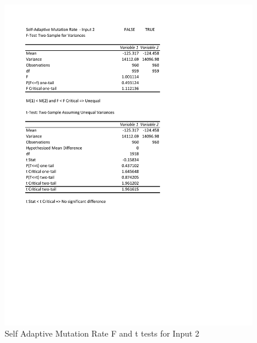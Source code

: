 \documentclass[times]{article}
\begin{document}
	\begin{figure}
		\caption{Self Adaptive Mutation Rate F and t tests for Input 2}
		\label{fig:saMutation2}
		\includegraphics[width=\textwidth]{./t_test/S-AMutationRate2}
	\end{figure}
\end{document}
